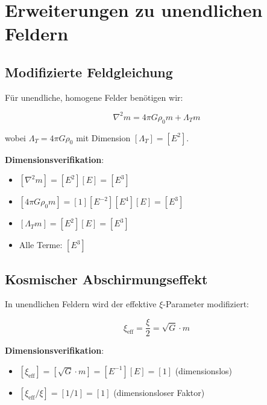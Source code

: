 \documentclass[12pt,a4paper]{article}
\begin{document}
	\section{Erweiterungen zu unendlichen Feldern}
	\label{sec:infinite_fields}
	
	\subsection{Modifizierte Feldgleichung}
	\label{subsec:modified_field_equation}
	
	Für unendliche, homogene Felder benötigen wir:
	
	\begin{equation}
		\label{eq:infinite_field_equation}
		\nabla^2 m = 4\pi G \rho_0 m + \Lambda_T m
	\end{equation}
	
	wobei $\Lambda_T = 4\pi G \rho_0$ mit Dimension $[\Lambda_T] = [E^2]$.
	
	\textbf{Dimensionsverifikation}:
	\begin{itemize}
		\item $[\nabla^2 m] = [E^2][E] = [E^3]$
		\item $[4\pi G \rho_0 m] = [1][E^{-2}][E^4][E] = [E^3]$
		\item $[\Lambda_T m] = [E^2][E] = [E^3]$
		\item Alle Terme: $[E^3]$ \checkmark
	\end{itemize}
	
	\subsection{Kosmischer Abschirmungseffekt}
	\label{subsec:cosmic_screening}
	
	In unendlichen Feldern wird der effektive $\xi$-Parameter modifiziert:
	
	\begin{equation}
		\label{eq:xi_effective}
		\xi_{\text{eff}} = \frac{\xi}{2} = \sqrt{G} \cdot m
	\end{equation}
	
	\textbf{Dimensionsverifikation}:
	\begin{itemize}
		\item $[\xi_{\text{eff}}] = [\sqrt{G} \cdot m] = [E^{-1}][E] = [1]$ (dimensionslos) \checkmark
		\item $[\xi_{\text{eff}}/\xi] = [1/1] = [1]$ (dimensionsloser Faktor) \checkmark
	\end{itemize}
	
\end{document}
